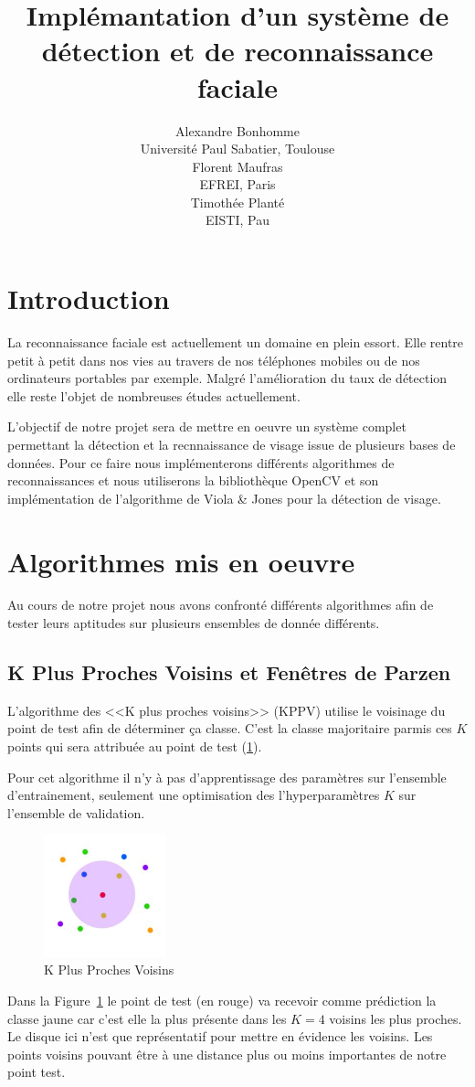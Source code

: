 \documentclass[a4paper,10pt,twocolumn]{extarticle}
\title{\textsf{Implémantation d’un système de détection et de reconnaissance faciale}}
\author{Alexandre Bonhomme\\ {\normalsize Université Paul Sabatier, Toulouse}\\
Florent Maufras\\ {\normalsize EFREI, Paris}\\
Timothée Planté\\ {\normalsize EISTI, Pau}\\}%
\date{}
\begin{document}
\maketitle
\section{Introduction}
La reconnaissance faciale est actuellement un domaine en plein essort. Elle rentre petit à petit dans nos vies au travers de nos téléphones mobiles ou de nos ordinateurs portables par exemple. Malgré l'amélioration du taux de détection elle reste l'objet de nombreuses études actuellement.

L'objectif de notre projet sera de mettre en oeuvre un système complet permettant la détection et la recnnaissance de visage issue de plusieurs bases de données. Pour ce faire nous implémenterons différents algorithmes de reconnaissances et nous utiliserons la bibliothèque OpenCV \cite{opencv} et son implémentation de l'algorithme de Viola \& Jones pour la détection de visage.

\section{Algorithmes mis en oeuvre}
Au cours de notre projet nous avons confronté différents algorithmes afin de tester leurs aptitudes sur plusieurs ensembles de donnée différents.

\subsection{K Plus Proches Voisins et Fenêtres de Parzen}
L'algorithme des <<K plus proches voisins>> (KPPV) utilise le voisinage du point de test afin de déterminer ça classe. C'est la classe majoritaire parmis ces $K$ points qui sera attribuée au point de test (\ref{fig:knn}).

Pour cet algorithme il n'y à pas d'apprentissage des paramètres sur l'ensemble d'entrainement, seulement une optimisation des l'hyperparamètres $K$ sur l'ensemble de validation.
\begin{figure}[H]
  \begin{center}
    \includegraphics[width=100pt]{images_rapport/KNN.png}
    \caption{K Plus Proches Voisins}
    \label{fig:knn}
  \end{center}
\end{figure}
Dans la Figure~\ref{fig:knn} le point de test (en rouge) va recevoir comme prédiction la classe jaune car c'est elle la plus présente dans les $K = 4$ voisins les plus proches. Le disque ici n'est que représentatif pour mettre en évidence les voisins. Les points voisins pouvant être à une distance plus ou moins importantes de notre point test.
\end{document}
